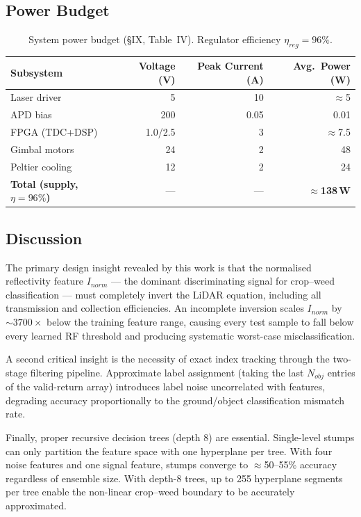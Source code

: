 \documentclass[12pt,a4paper]{article}
\begin{document}
\subsection{Power Budget}

\begin{table}[H]
\centering
\caption{System power budget (\S IX, Table~IV). Regulator efficiency $\eta_{reg} = 96\%$.}
\label{tab:power}
\begin{tabular}{lrrr}
\toprule
\textbf{Subsystem} & \textbf{Voltage (V)} & \textbf{Peak Current (A)} & \textbf{Avg.\ Power (W)} \\
\midrule
Laser driver         & 5     & 10    & $\approx$5 \\
APD bias             & 200   & 0.05  & 0.01 \\
FPGA (TDC+DSP)       & 1.0/2.5 & 3   & $\approx$7.5 \\
Gimbal motors        & 24    & 2     & 48 \\
Peltier cooling      & 12    & 2     & 24 \\
\midrule
\textbf{Total (supply, $\eta=96\%$)} & --- & --- & \textbf{$\approx$138\,W} \\
\bottomrule
\end{tabular}
\end{table}

\subsection{Discussion}

The primary design insight revealed by this work is that the normalised reflectivity
feature $I_{norm}$ --- the dominant discriminating signal for crop--weed classification
--- must completely invert the LiDAR equation, including all transmission and
collection efficiencies.  An incomplete inversion scales $I_{norm}$ by
$\sim\!3700\times$ below the training feature range, causing every test sample to fall
below every learned RF threshold and producing systematic worst-case
misclassification.

A second critical insight is the necessity of exact index tracking through the
two-stage filtering pipeline.  Approximate label assignment (taking the last $N_{obj}$
entries of the valid-return array) introduces label noise uncorrelated with features,
degrading accuracy proportionally to the ground/object classification mismatch rate.

Finally, proper recursive decision trees (depth 8) are essential.  Single-level stumps
can only partition the feature space with one hyperplane per tree.  With four noise
features and one signal feature, stumps converge to $\approx$50--55\% accuracy
regardless of ensemble size.  With depth-8 trees, up to 255 hyperplane segments per
tree enable the non-linear crop--weed boundary to be accurately approximated.
\end{document}
